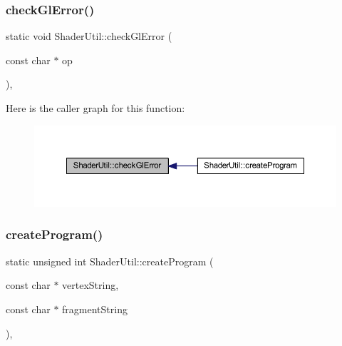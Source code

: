 \subsubsection{\texorpdfstring{check\+Gl\+Error()}{checkGlError()}}
{\footnotesize\ttfamily static void Shader\+Util\+::check\+Gl\+Error (\begin{DoxyParamCaption}\item[{const char $\ast$}]{op }\end{DoxyParamCaption})\hspace{0.3cm}{\ttfamily [inline]}, {\ttfamily [static]}}

Here is the caller graph for this function\+:\nopagebreak
\begin{figure}[H]
\begin{center}
\leavevmode
\includegraphics[width=350pt]{class_shader_util_a3a0583a1b4016c3b30ed99a28ca2e6c9_icgraph}
\end{center}
\end{figure}
\mbox{\label{class_shader_util_a1bcf8dcf6d12750db82a13321257a33e}} 
\subsubsection{\texorpdfstring{create\+Program()}{createProgram()}}
{\footnotesize\ttfamily static unsigned int Shader\+Util\+::create\+Program (\begin{DoxyParamCaption}\item[{const char $\ast$}]{vertex\+String,  }\item[{const char $\ast$}]{fragment\+String }\end{DoxyParamCaption})\hspace{0.3cm}{\ttfamily [inline]}, {\ttfamily [static]}}

